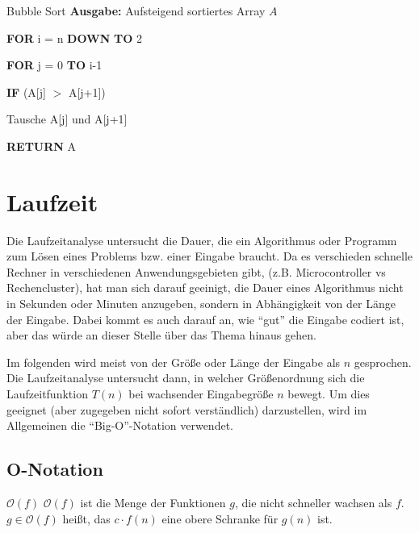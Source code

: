 \documentclass{panikzettel}
\newcommand\tab[1][1cm]{\hspace*{#1}}
\begin{document}
{\begin{halfboxr}
\begin{algo}{Bubble Sort}
		\textbf{Ausgabe:} Aufsteigend sortiertes Array $A$
		\tcblower
		
		\textbf{FOR} i = n \textbf{DOWN}\footnotemark \textbf{ TO} 2
		
		\tab \textbf{FOR} j = 0 \textbf{TO} i-1
		
		\tab\tab \textbf{IF} (A[j] $>$ A[j+1])
		
		\tab\tab\tab Tausche A[j] und A[j+1]
		
		\textbf{RETURN} A
	\end{algo}
\end{halfboxr}





\section{Laufzeit}

Die Laufzeitanalyse untersucht die Dauer, die ein Algorithmus oder Programm zum Lösen eines Problems bzw. einer Eingabe braucht. Da es verschieden schnelle Rechner in verschiedenen Anwendungsgebieten gibt, (z.B. Microcontroller vs Rechencluster), hat man sich darauf geeinigt, die Dauer eines Algorithmus nicht in Sekunden oder Minuten anzugeben, sondern in Abhängigkeit von der Länge der Eingabe. Dabei kommt es auch darauf an, wie ``gut'' die Eingabe codiert ist, aber das würde an dieser Stelle über das Thema hinaus gehen. 

Im folgenden wird meist von der Größe oder Länge der Eingabe als $n$ gesprochen. Die Laufzeitanalyse untersucht dann, in welcher Größenordnung sich die Laufzeitfunktion $T(n)$ bei wachsender Eingabegröße $n$ bewegt. Um dies geeignet (aber zugegeben nicht sofort verständlich) darzustellen, wird im Allgemeinen die ``Big-O''-Notation verwendet.

\subsection{O-Notation}

\begin{thirdboxl}
	\vspace{-\baselineskip}	
	\begin{defi}{$\mathcal{O}(f)$}
		$\mathcal{O}(f)$ ist die Menge der Funktionen $g$, die nicht schneller wachsen als $f$. $g\in \mathcal{O}(f)$ heißt, das $c \cdot f(n)$ eine obere Schranke für $g(n)$ ist. 
		

\end{defi}
\end{thirdboxl}}
\end{document}
